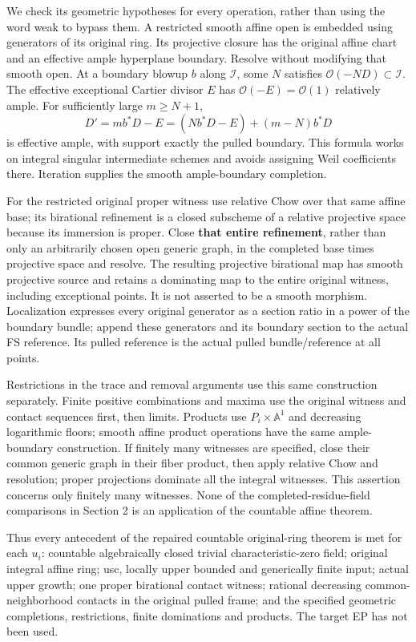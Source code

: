\documentclass[
  10pt,
]{article}
\begin{document}
We check its geometric hypotheses for every operation, rather than using
the word weak to bypass them. A restricted smooth affine open is
embedded using generators of its original ring. Its projective closure
has the original affine chart and an effective ample hyperplane
boundary. Resolve without modifying that smooth open. At a boundary
blowup \(b\) along \(\mathcal I\), some \(N\) satisfies
\(\mathcal O(-ND)\subset\mathcal I\). The effective exceptional Cartier
divisor \(E\) has \(\mathcal O(-E)=\mathcal O(1)\) relatively ample. For
sufficiently large \(m\ge N+1\), \[D'=mb^*D-E=(Nb^*D-E)+(m-N)b^*D\] is
effective ample, with support exactly the pulled boundary. This formula
works on integral singular intermediate schemes and avoids assigning
Weil coefficients there. Iteration supplies the smooth ample-boundary
completion.

For the restricted original proper witness use relative Chow over that
same affine base; its birational refinement is a closed subscheme of a
relative projective space because its immersion is proper. Close
\textbf{that entire refinement}, rather than only an arbitrarily chosen
open generic graph, in the completed base times projective space and
resolve. The resulting projective birational map has smooth projective
source and retains a dominating map to the entire original witness,
including exceptional points. It is not asserted to be a smooth
morphism. Localization expresses every original generator as a section
ratio in a power of the boundary bundle; append these generators and its
boundary section to the actual FS reference. Its pulled reference is the
actual pulled bundle/reference at all points.

Restrictions in the trace and removal arguments use this same
construction separately. Finite positive combinations and maxima use the
original witness and contact sequences first, then limits. Products use
\(P_i\times\mathbb A^1\) and decreasing logarithmic floors; smooth
affine product operations have the same ample-boundary construction. If
finitely many witnesses are specified, close their common generic graph
in their fiber product, then apply relative Chow and resolution; proper
projections dominate all the integral witnesses. This assertion concerns
only finitely many witnesses. None of the completed-residue-field
comparisons in Section 2 is an application of the countable affine
theorem.

Thus every antecedent of the repaired countable original-ring theorem is
met for each \(u_i\): countable algebraically closed trivial
characteristic-zero field; original integral affine ring; usc, locally
upper bounded and generically finite input; actual upper growth; one
proper birational contact witness; rational decreasing
common-neighborhood contacts in the original pulled frame; and the
specified geometric completions, restrictions, finite dominations and
products. The target EP has not been used.
\end{document}
